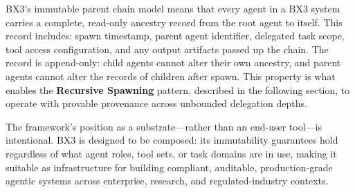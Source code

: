 BX3's immutable parent chain model means that every agent in a BX3 system carries a complete, read-only ancestry record from the root agent to itself. This record includes: spawn timestamp, parent agent identifier, delegated task scope, tool access configuration, and any output artifacts passed up the chain. The record is append-only: child agents cannot alter their own ancestry, and parent agents cannot alter the records of children after spawn. This property is what enables the \textbf{Recursive Spawning} pattern, described in the following section, to operate with provable provenance across unbounded delegation depths.

The framework's position as a substrate—rather than an end-user tool—is intentional. BX3 is designed to be composed: its immutability guarantees hold regardless of what agent roles, tool sets, or task domains are in use, making it suitable as infrastructure for building compliant, auditable, production-grade agentic systems across enterprise, research, and regulated-industry contexts.



